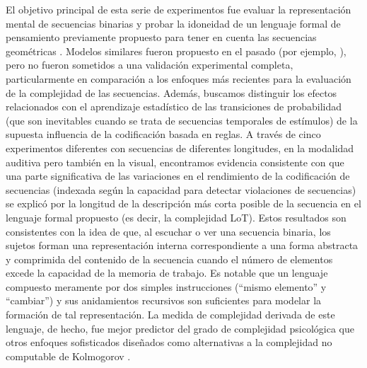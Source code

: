 El objetivo principal de esta serie de experimentos fue evaluar la representación mental de secuencias binarias y probar la idoneidad de un lenguaje formal de pensamiento previamente propuesto para tener en cuenta las secuencias geométricas \cite{amalric2017language}. Modelos similares fueron propuesto en el pasado (por ejemplo, \cite{f32,f36,f45}), pero no fueron sometidos a una validación experimental completa, particularmente en comparación a los enfoques más recientes para la evaluación de la complejidad de las secuencias. Además, buscamos distinguir los efectos relacionados con el aprendizaje estadístico de las transiciones de probabilidad (que son inevitables cuando se trata de secuencias temporales de estímulos) de la supuesta influencia de la codificación basada en reglas. A través de cinco experimentos diferentes con secuencias de diferentes longitudes, en la modalidad auditiva pero también en la visual, encontramos evidencia consistente con que una parte significativa de las variaciones en el rendimiento de la codificación de secuencias (indexada según la capacidad para detectar violaciones de secuencias) se explicó por la longitud de la descripción más corta posible de la secuencia en el lenguaje formal propuesto (es decir, la complejidad LoT). Estos resultados son consistentes con la idea de que, al escuchar o ver una secuencia binaria, los sujetos forman una representación interna correspondiente a una forma abstracta y comprimida del contenido de la secuencia cuando el número de elementos excede la capacidad de la memoria de trabajo. Es notable que un lenguaje compuesto meramente por dos simples instrucciones (``mismo elemento'' y ``cambiar'') y sus anidamientos recursivos son suficientes para modelar la formación de tal representación. La medida de complejidad derivada de este lenguaje, de hecho, fue mejor predictor del grado de complejidad psicológica que otros enfoques sofisticados diseñados como alternativas a la complejidad no computable de Kolmogorov \cite{f46,f47}.


